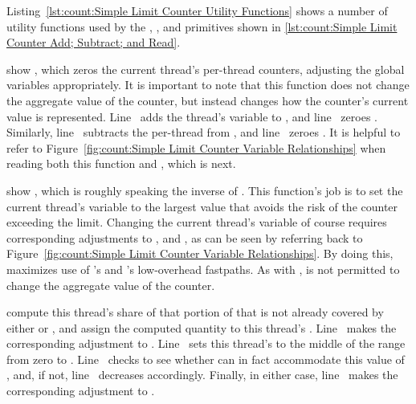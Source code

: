 Listing~\ref{lst:count:Simple Limit Counter Utility Functions}
shows a number of utility functions used by the ,
, and  primitives shown in
\cref{lst:count:Simple Limit Counter Add; Subtract; and Read}.

\begin{fcvref}
 show ,
which zeros the current thread's
per-thread counters, adjusting the global variables appropriately.
It is important to note that this function does not change the aggregate
value of the counter, but instead changes how the counter's current value
is represented.
Line~ adds the thread's  variable to ,
and line~ zeroes .
Similarly, line~ subtracts the per-thread  from
, and line~ zeroes .
It is helpful to refer to
Figure~\ref{fig:count:Simple Limit Counter Variable Relationships}
when reading both this function and , which is next.
\end{fcvref}

\begin{fcvref}
 show ,
which is roughly speaking
the inverse of .
This function's job is to set the current thread's
 variable to the largest value that avoids the risk
of the counter exceeding the  limit.
Changing the current thread's  variable of course
requires corresponding adjustments to , 
and , as can be seen by referring back to
Figure~\ref{fig:count:Simple Limit Counter Variable Relationships}.
By doing this,  maximizes use of
's and 's low-overhead fastpaths.
As with ,  is not permitted
to change the aggregate value of the counter.

 compute this thread's share of
that portion of
 that is not already covered by either
 or , and assign the
computed quantity to this thread's .
Line~ makes the corresponding adjustment to .
Line~ sets this thread's  to the middle of the range
from zero to .
Line~ checks to see whether  can in fact accommodate
this value of , and, if not,
line~ decreases 
accordingly.
Finally, in either case,
line~ makes the corresponding adjustment to
.
\end{fcvref}

